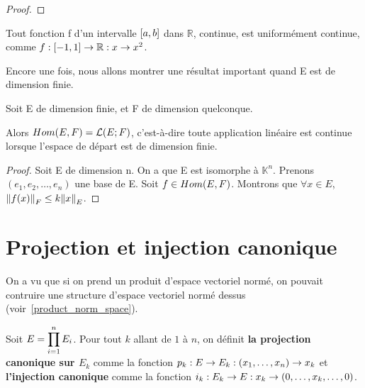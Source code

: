 \ifdefined\outputproof
\begin{proof}

\end{proof}
\fi

\begin{exemple}
	Tout fonction f d'un intervalle $\left[a, b\right]$ dans $\mathbb{R}$, continue, est
	uniformément continue, comme
	$f : \left[-1, 1\right] \rightarrow \mathbb{R} : x \rightarrow x^2$.
\end{exemple}

Encore une fois, nous allons montrer une résultat important quand E est de
dimension finie.

\begin{proposition}
	Soit E de dimension finie, et F de dimension quelconque.

	Alors $Hom(E, F) = \mathcal{L}(E; F)$, c'est-à-dire toute
	application linéaire est continue lorsque l'espace de départ est de
	dimension finie.
\end{proposition}

\ifdefined\outputproof
\begin{proof}
	Soit E de dimension n.
	On a que E est isomorphe à $\mathbb{K}^{n}$. Prenons $(e_{1}, e_{2}, \ldots,
	e_{n})$ une base de E.
	Soit $f \in Hom(E, F)$. Montrons que $\forall x \in E$,
	$\norm{f(x)}_{F} \leq k\norm{x}_{E}$.
\end{proof}
\fi

\section{Projection et injection canonique}

On a vu que si on prend un produit d'espace vectoriel normé, on pouvait
contruire une structure d'espace vectoriel normé dessus (voir~\ref{product_norm_space}).


\begin{definition} 
	\label{injection_projection_definition}
	Soit $E =  \displaystyle \prod_{i = 1}^{n} E_{i}$.
	Pour tout $k$ allant de $1$ à $n$, on définit \textbf{la projection
		canonique sur $E_{k}$} comme la fonction
		$p_{k} : E \rightarrow E_{k} : (x_{1}, \ldots, x_{n}) \rightarrow
		x_{k}$ et \textbf{l'injection canonique}
		comme la fonction $i_{k} : E_{k} \rightarrow E : x_{k}
		\rightarrow (0, \ldots, x_{k}, \ldots, 0)$.
\end{definition}

